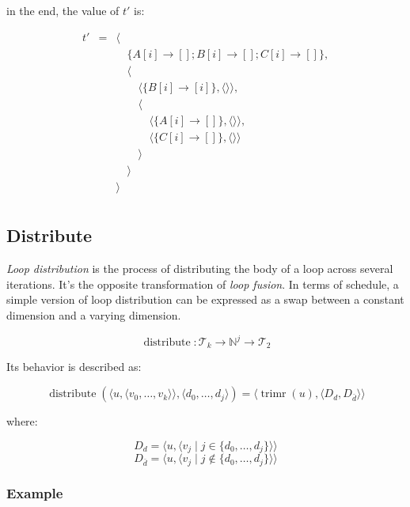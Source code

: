 \documentclass{article}
\DeclareMathOperator\trimr{trimr}
\DeclareMathOperator\distribute{distribute}
\begin{document}
\noindent in the end, the value of $t'$ is:

\[
    \begin{array}{lcl}
        t'&=& \langle \\
          & & \quad\{A[i] \rightarrow []; B[i] \rightarrow []; C[i] \rightarrow []  \},\\
          & & \quad\langle \\
          & & \quad\quad \langle\{ B[i] \rightarrow [i] \}, \langle\rangle\rangle,\\
          & & \quad\quad\langle\\
          & & \quad\quad\quad\langle\{ A[i] \rightarrow [] \}, \langle\rangle\rangle, \\
          & & \quad\quad\quad\langle\{ C[i] \rightarrow [] \}, \langle\rangle\rangle \\
          & & \quad\quad\rangle\\
          & & \quad\rangle \\
          & & \rangle \\
    \end{array}
\]


\subsection{Distribute}

\emph{Loop distribution} is the process of distributing the body of a loop
across several iterations. It's the opposite transformation of \emph{loop
fusion}. In terms of schedule, a simple version of loop distribution can be
expressed as a swap between a constant dimension and a varying dimension.

\[
    \distribute: \mathcal{T}_k \rightarrow \mathbb{N}^j \rightarrow \mathcal{T}_{2}
\]

Its behavior is described as:

\[
    \distribute(\langle  u, \langle v_0, \ldots, v_k\rangle \rangle, \langle d_0, \ldots, d_j\rangle) = \langle \trimr(u), \langle D_d, D_{\bar{d}} \rangle \rangle
\]

\noindent where:

\[
    D_d = \langle u, \langle v_j \mid j \in \{ d_0, \ldots, d_j\}\rangle \rangle
\]
\[
    D_{\bar{d}} = \langle u, \langle v_j \mid j \not\in \{ d_0, \ldots, d_j\}\rangle \rangle
\]

\subsubsection*{Example}
\end{document}
